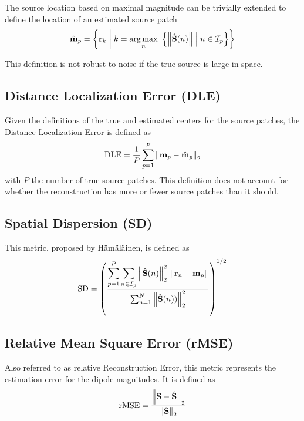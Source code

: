 The source location based on maximal magnitude can be trivially extended to define the location of an estimated source patch
\begin{equation}
    \hat{\mathbf{m}}_p = \left\{ \mathbf{r}_k \;\middle|\; k = \operatorname*{arg\,max}_n\,\,
    \left\{ \left\lVert \hat{\mathbf{S}}(n) \right\rVert \;\middle|\; n\in \mathcal{I}_p  \right\}
     \right\}
\end{equation}

This definition is not robust to noise if the true source is large in space.

\subsection{Distance Localization Error (DLE)}

Given the definitions of the true and estimated centers for the source patches, the Distance Localization Error is defined as
\begin{equation}
\text{DLE} = 
\frac{1}{P} \sum_{p=1}^P \left\lVert  \mathbf{m}_p - \hat{\mathbf{m}}_p  \right\rVert_2
\label{def:DLE}
\end{equation}
with $P$ the number of true source patches.
%
This definition does not account for whether the reconstruction has more or fewer source patches than it should.

\subsection{Spatial Dispersion (SD)}

This metric, proposed by H\"{a}m\"{a}l\"{a}inen, is defined as
\begin{equation}
\text{SD}
=
\left( 
\frac{ \displaystyle
\sum_{p=1}^P \sum_{n\in \mathcal{I}_p} \left\lVert \hat{\mathbf{S}}(n) \right\rVert_2^2\, \left\lVert \mathbf{r}_n-\mathbf{m}_p \right\rVert }{\sum_{n=1}^N \left\lVert \hat{\mathbf{S}}(n)) \right\rVert_2^2}
 \right)^{1/2}
\end{equation}

\subsection{Relative Mean Square Error (rMSE)}

Also referred to as relative Reconstruction Error, this metric represents the estimation error for the dipole magnitudes. 
%
It is defined as
\begin{equation}
\text{rMSE} = 
\frac{\left\lVert \mathbf{S} - \hat{\mathbf{S}} \right\rVert_2}{\left\lVert \mathbf{S} \right\rVert_2}
\end{equation}

